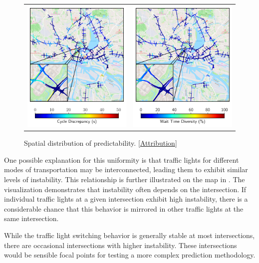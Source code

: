 \begin{figure}[t]
\centering 
\begin{tabular}{@{}cc@{}}
\includegraphics[width=0.46\linewidth]{images/predictability-map.pdf} & \includegraphics[width=0.46\linewidth]{images/predictability-map-diversity.pdf}
\end{tabular}
\caption{Spatial distribution of predictability. [\hyperref[attribution]{Attribution}]}\label{fig:predictability-map}
\end{figure}

One possible explanation for this uniformity is that traffic lights for different modes of transportation may be interconnected, leading them to exhibit similar levels of instability. This relationship is further illustrated on the map in . The visualization demonstrates that instability often depends on the intersection. If individual traffic lights at a given intersection exhibit high instability, there is a considerable chance that this behavior is mirrored in other traffic lights at the same intersection.

While the traffic light switching behavior is generally stable at most intersections, there are occasional intersections with higher instability. These intersections would be sensible focal points for testing a more complex prediction methodology.

